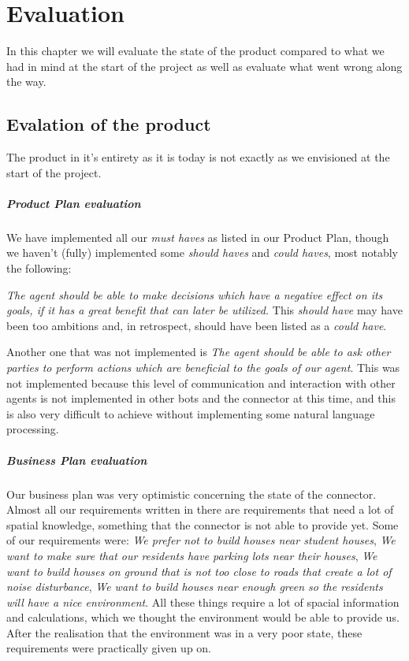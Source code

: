 \chapter{Evaluation}
In this chapter we will evaluate the state of the product compared to what we had in mind at the start of the project as well as evaluate what went wrong along the way.

\section{Evalation of the product}
The product in it's entirety as it is today is not exactly as we envisioned at the start of the project.

\paragraph{Product Plan evaluation} We have implemented all our \emph{must haves} as listed in our Product Plan, though we haven't (fully) implemented some \emph{should haves} and \emph{could haves}, most notably the following:

\emph{The agent should be able to make decisions which have a negative effect on its goals, if it has a great benefit that can later be utilized.} This \emph{should have} may have been too ambitions and, in retrospect, should have been listed as a \emph{could have}.

Another one that was not implemented is \emph{The agent should be able to ask other parties to perform actions which are beneficial to the goals of our agent}. This was not implemented because this level of communication and interaction with other agents is not implemented in other bots and the connector at this time, and this is also very difficult to achieve without implementing some natural language processing.

\paragraph{Business Plan evaluation} Our business plan was very optimistic concerning the state of the connector. Almost all our requirements written in there are requirements that need a lot of spatial knowledge, something that the connector is not able to provide yet. Some of our requirements were: \emph{We prefer not to build houses near student houses}, \emph{We want to make sure that our residents have parking lots near their houses}, \emph{We want to build houses on ground that is not too close to roads that create a lot of noise disturbance}, \emph{We want to build houses near enough green so the residents will have a nice environment}. All these things require a lot of spacial information and calculations, which we thought the environment would be able to provide us. After the realisation that the environment was in a very poor state, these requirements were practically given up on.

